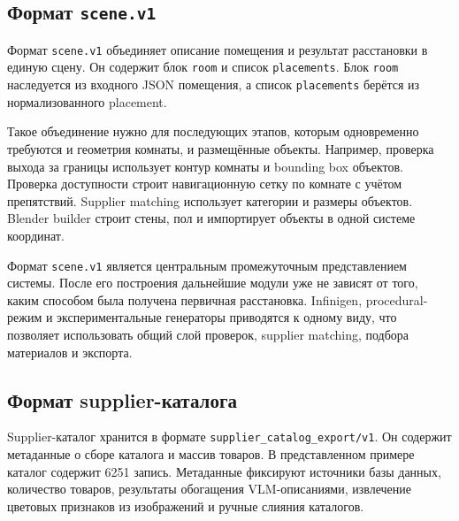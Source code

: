 \documentclass[times]{itmo-student-thesis}
\begin{document}
\subsection{Формат \texttt{scene.v1}}

Формат \texttt{scene.v1} объединяет описание помещения и результат расстановки в единую сцену. Он содержит блок \texttt{room} и список \texttt{placements}. Блок \texttt{room} наследуется из входного JSON помещения, а список \texttt{placements} берётся из нормализованного placement.

Такое объединение нужно для последующих этапов, которым одновременно требуются и геометрия комнаты, и размещённые объекты. Например, проверка выхода за границы использует контур комнаты и bounding box объектов. Проверка доступности строит навигационную сетку по комнате с учётом препятствий. Supplier matching использует категории и размеры объектов. Blender builder строит стены, пол и импортирует объекты в одной системе координат.

Формат \texttt{scene.v1} является центральным промежуточным представлением системы. После его построения дальнейшие модули уже не зависят от того, каким способом была получена первичная расстановка. Infinigen, procedural-режим и экспериментальные генераторы приводятся к одному виду, что позволяет использовать общий слой проверок, supplier matching, подбора материалов и экспорта.

\subsection{Формат supplier-каталога}

Supplier-каталог хранится в формате \texttt{supplier\_catalog\_export/v1}. Он содержит метаданные о сборе каталога и массив товаров. В представленном примере каталог содержит 6251 запись. Метаданные фиксируют источники базы данных, количество товаров, результаты обогащения VLM-описаниями, извлечение цветовых признаков из изображений и ручные слияния каталогов.
\end{document}
